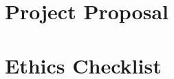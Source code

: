 \titleformat{\chapter}[hang]
    {\normalfont\Huge\bfseries}{\chaptertitlename\ \thechapter\ -\ }{0pt}{\Huge}
\titlespacing*{\chapter}{0pt}{0pt}{20pt}


\begin{appendices}

\chapter{Project Proposal}
\thispagestyle{fancy} %


\chapter{Ethics Checklist}
\thispagestyle{fancy} %



\end{appendices}